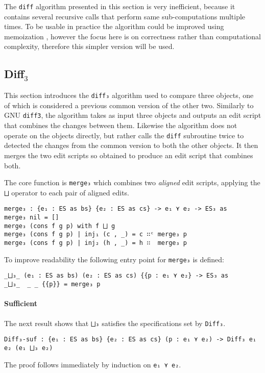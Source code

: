\documentclass[../Thesis.tex]{subfiles}
\begin{document}
	The \texttt{diff} algorithm presented in this section is very inefficient,
	because it contains several recursive calls that perform same 
	sub-computations multiple times. 
	To be usable in practice the algorithm could be improved using 
	memoization \cite{Lemp09}, however the focus here is on correctness 
	rather than computational complexity, therefore this simpler version will
	be used.

	\subsection{Diff$_3$}
	\label{subsec:diff3}	
	This section introduces the \texttt{diff₃} algorithm used to compare 
	three objects, one of which is considered a previous common version
	of the other two.
	Similarly to GNU \texttt{diff3}, the algorithm takes as input three objects
	and outputs an edit script that combines the changes between them.
	Likewise the algorithm does not operate on the objects directly,
	but rather calls the \texttt{diff} subroutine twice to detected the changes 
	from the common version to both the other objects.
	It then merges the two edit scripts so obtained to produce an edit script
	that combines both.
	
	The core function is \texttt{merge₃} which combines two 
	\emph{aligned} edit scripts, applying the \texttt{⨆} operator to
	each pair of aligned edits. 
\begin{verbatim}
merge₃ : {e₁ : ES as bs} {e₂ : ES as cs} -> e₁ ⋎ e₂ -> ES₃ as
merge₃ nil = []
merge₃ (cons f g p) with f ⨆ g
merge₃ (cons f g p) | inj₁ (c , _) = c ∷ᶜ merge₃ p
merge₃ (cons f g p) | inj₂ (h , _) = h ∷  merge₃ p
\end{verbatim}
	
	To improve readability the following entry point for \texttt{merge₃} is
	defined:
\begin{verbatim}
_⨆₃_ (e₁ : ES as bs) (e₂ : ES as cs) {{p : e₁ ⋎ e₂} -> ES₃ as
_⨆₃_  _ _ {{p}} = merge₃ p
\end{verbatim}
	
	\paragraph{Sufficient}
	The next result shows that \texttt{⨆₃} satisfies
	the specifications set by \texttt{Diff₃}.
	
\begin{verbatim}
Diff₃-suf : {e₁ : ES as bs} {e₂ : ES as cs} (p : e₁ ⋎ e₂) -> Diff₃ e₁ e₂ (e₁ ⨆₃ e₂)
\end{verbatim}
	The proof follows immediately by induction 
	on \texttt{e₁ ⋎ e₂}.
\end{document}
